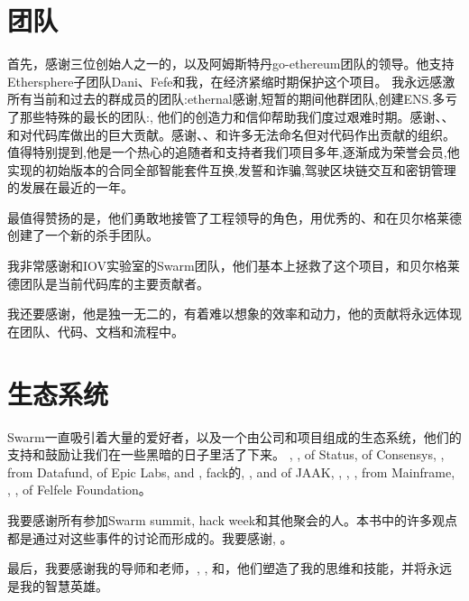 \section*{团队}

首先，感谢三位创始人之一的，以及阿姆斯特丹go-ethereum团队的领导。他支持Ethersphere子团队Dani、Fefe和我，在经济紧缩时期保护这个项目。
我永远感激所有当前和过去的群成员的团队:ethernal感谢,短暂的期间他群团队,创建ENS.多亏了那些特殊的最长的团队:,  他们的创造力和信仰帮助我们度过艰难时期。感谢、、和对代码库做出的巨大贡献。感谢、、和许多无法命名但对代码作出贡献的组织。
值得特别提到,他是一个热心的追随者和支持者我们项目多年,逐渐成为荣誉会员,他实现的初始版本的合同全部智能套件互换,发誓和诈骗,驾驶区块链交互和密钥管理的发展在最近的一年。

最值得赞扬的是，他们勇敢地接管了工程领导的角色，用优秀的、和在贝尔格莱德创建了一个新的杀手团队。 

我非常感谢和IOV实验室的Swarm团队，他们基本上拯救了这个项目，和贝尔格莱德团队是当前代码库的主要贡献者。 

我还要感谢，他是独一无二的，有着难以想象的效率和动力，他的贡献将永远体现在团队、代码、文档和流程中。

\section*{生态系统}

Swarm一直吸引着大量的爱好者，以及一个由公司和项目组成的生态系统，他们的支持和鼓励让我们在一些黑暗的日子里活了下来。 
, ,  of Status,  of Consensys, ,  from Datafund,  of Epic Labs,  and , fack的, ,  and  of JAAK, , , ,  from Mainframe, , ,  of Felfele Foundation。 

我要感谢所有参加Swarm summit, hack week和其他聚会的人。本书中的许多观点都是通过对这些事件的讨论而形成的。我要感谢, 。

最后，我要感谢我的导师和老师，, , 和，他们塑造了我的思维和技能，并将永远是我的智慧英雄。

